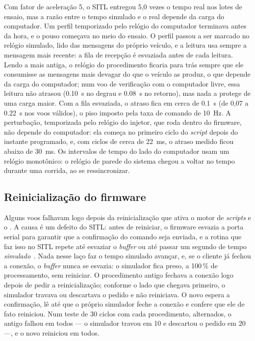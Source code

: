 Com fator de aceleração 5, o SITL entregou
5,0 vezes o tempo real nos lotes de ensaio, mas a razão entre o tempo
simulado e o real depende da carga do computador. Um perfil temporizado pelo
relógio do computador terminava antes da hora, e o pouso começava no meio do
ensaio. O perfil passou a ser marcado no relógio simulado, lido das mensagens
do próprio veículo, e a leitura usa sempre a mensagem mais recente: a fila de
recepção é esvaziada antes de cada leitura. Lendo a mais antiga, o relógio do
procedimento ficaria para trás sempre que ele consumisse as mensagens mais
devagar do que o veículo as produz, o que depende da carga do computador; num
voo de verificação com o computador livre, essa leitura não atrasou
(\SI{0.10}{\second} no degrau e \SI{0.08}{\second} no retorno), mas nada a
protege de uma carga maior. Com a fila esvaziada, o atraso fica em cerca de
\SI{0.1}{\second} (de 0,07 a \SI{0.22}{\second} nos voos válidos), o piso
imposto pela taxa de comando de \SI{10}{\hertz}. A perturbação, temporizada
pelo relógio do injetor, que roda dentro do firmware, não depende do
computador: ela começa no primeiro ciclo do \textit{script} depois do instante
programado, e, com ciclos de cerca de \SI{22}{\milli\second}, o atraso
medido ficou abaixo de \SI{30}{\milli\second}. Os intervalos
de tempo do lado do computador usam um relógio monotônico: o relógio de
parede do sistema chegou a voltar no tempo durante uma corrida, ao se
ressincronizar.

\subsection{Reinicialização do firmware}

Alguns voos falhavam logo depois
da reinicialização que ativa o motor de \textit{scripts} e o
. A causa é um defeito do SITL: antes de
reiniciar, o firmware esvazia a porta serial para garantir que a confirmação
do comando seja enviada, e a rotina que faz isso no SITL repete até esvaziar
o \textit{buffer} ou até passar um segundo de tempo
\emph{simulado}~\cite{ardupilot2026}. Nada nesse laço faz o tempo simulado
avançar, e, se o cliente já fechou a conexão, o \textit{buffer} nunca se
esvazia: o simulador fica preso, a 100\,\% de processamento, sem reiniciar. O
procedimento antigo fechava a conexão logo depois de pedir a reinicialização;
conforme o lado que chegava primeiro, o simulador travava ou descartava o
pedido e não reiniciava. O novo espera a confirmação, lê até que o próprio
simulador feche a conexão e confere que ele de fato reiniciou. Num teste de 30
ciclos com cada procedimento, alternados, o antigo falhou em todos --- o
simulador travou em 10 e descartou o pedido em 20 ---, e o novo reiniciou em
todos.

